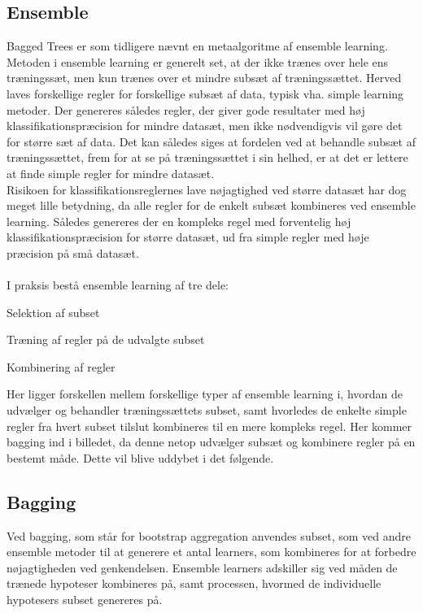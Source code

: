 \subsection{Ensemble}
Bagged Trees er som tidligere nævnt en metaalgoritme af ensemble learning. Metoden i ensemble learning er generelt set, at der ikke trænes over hele ens træningssæt, men kun trænes over et mindre subsæt af træningssættet. Herved laves forskellige regler for forskellige subsæt af data, typisk vha. simple learning metoder. Der genereres således regler, der giver gode resultater med høj klassifikationspræcision for mindre datasæt, men ikke nødvendigvis vil gøre det for større sæt af data. 
Det kan således siges at fordelen ved at behandle subsæt af træningssættet, frem for at se på træningssættet i sin helhed, er at det er lettere at finde simple regler for mindre datasæt.
\\Risikoen for klassifikationsreglernes lave nøjagtighed ved større datasæt har dog meget lille betydning, da alle regler for de enkelt subsæt kombineres ved ensemble learning. Således genereres der en kompleks regel med forventelig høj klassifikationspræcision for større datasæt, ud fra simple regler med høje præcision på små datasæt.
\\\\
I praksis bestå ensemble learning af tre dele:
\begin{myEnumerate}
\item Selektion af subset
\item Træning af regler på de udvalgte subset
\item Kombinering af regler 
\end{myEnumerate}

Her ligger forskellen mellem forskellige typer af ensemble learning i, hvordan de udvælger og behandler træningssættets subset, samt hvorledes de enkelte simple regler fra hvert subset tilslut kombineres til en mere kompleks regel. 
Her kommer bagging ind i billedet, da denne netop udvælger subsæt og kombinere regler på en bestemt måde. Dette vil blive uddybet i det følgende. 

\subsection{Bagging}
Ved bagging, som står for bootstrap aggregation anvendes subset, som ved andre ensemble metoder til at generere et antal learners, som kombineres for at forbedre nøjagtigheden ved genkendelsen. Ensemble learners adskiller sig ved måden de trænede hypoteser kombineres på, samt processen, hvormed de individuelle hypotesers subset genereres på. 

